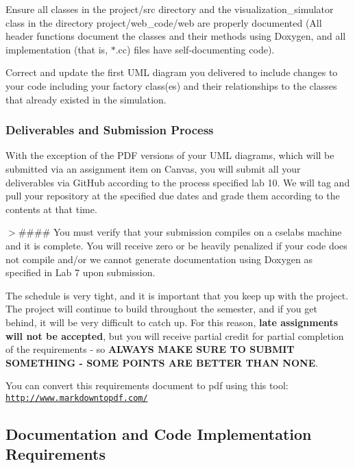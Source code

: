 \begin{DoxyEnumerate}
\begin{DoxyEnumerate}
\item Ensure all classes in the {\ttfamily project/src} directory and the visualization\+\_\+simulator class in the directory {\ttfamily project/web\+\_\+code/web} are properly documented (All header functions document the classes and their methods using Doxygen, and all implementation (that is, $\ast$.cc) files have self-\/documenting code).
\item Correct and update the first U\+ML diagram you delivered to include changes to your code including your factory class(es) and their relationships to the classes that already existed in the simulation.
\end{DoxyEnumerate}
\end{DoxyEnumerate}

\subsubsection*{Deliverables and Submission Process}

With the exception of the P\+DF versions of your U\+ML diagrams, which will be submitted via an assignment item on Canvas, you will submit all your deliverables via Git\+Hub according to the process specified lab 10. We will tag and pull your repository at the specified due dates and grade them according to the contents at that time.

$>$\#\#\#\# You must verify that your submission compiles on a cselabs machine and it is complete. You will receive zero or be heavily penalized if your code does not compile and/or we cannot generate documentation using Doxygen as specified in Lab 7 upon submission.

The schedule is very tight, and it is important that you keep up with the project. The project will continue to build throughout the semester, and if you get behind, it will be very difficult to catch up. For this reason, {\bfseries late assignments will not be accepted}, but you will receive partial credit for partial completion of the requirements -\/ so {\bfseries A\+L\+W\+A\+YS M\+A\+KE S\+U\+RE TO S\+U\+B\+M\+IT S\+O\+M\+E\+T\+H\+I\+NG -\/ S\+O\+ME P\+O\+I\+N\+TS A\+RE B\+E\+T\+T\+ER T\+H\+AN N\+O\+NE}.

You can convert this requirements document to pdf using this tool\+: \href{http://www.markdowntopdf.com/}{\tt http\+://www.\+markdowntopdf.\+com/}





\subsection*{Documentation and Code Implementation Requirements}

